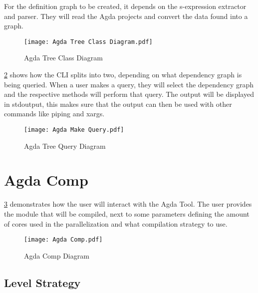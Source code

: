 For the definition graph to be created, it depends on the s-expression
extractor and parser. They will read the Agda projects and convert the data
found into a graph.

\begin{figure}[H]
    \centering
    \texttt{[image: Agda Tree Class Diagram.pdf]}
    \caption{Agda Tree Class Diagram}
    \label{fig:Agda Tree Class Diagram}
\end{figure} 
    
\pagebreak

\cref{fig:Agda Tree Query Diagram} shows how the CLI splits into two,
depending on what dependency graph is being queried. When a user makes a query,
they will select the dependency graph and the respective methods will perform
that query. The output will be displayed in stdoutput, this makes sure that the
output can then be used with other commands like piping and xargs.

\begin{figure}[H]
    \centering
    \texttt{[image: Agda Make Query.pdf]}
    \caption{Agda Tree Query Diagram}
    \label{fig:Agda Tree Query Diagram}
\end{figure} 

\pagebreak 


\section{Agda Comp}


\cref{fig:Agda Comp Diagram} demonstrates how the user will interact with
the Agda Tool. The user provides the module that will be compiled, next to some
parameters defining the amount of cores used in the parallelization and what
compilation strategy to use.
\begin{figure}[H]
    \centering 
    \texttt{[image: Agda Comp.pdf]}
    \caption{Agda Comp Diagram}
    \label{fig:Agda Comp Diagram}
\end{figure} 

\pagebreak
\subsection{Level Strategy} \label{sub:design level strategy}


